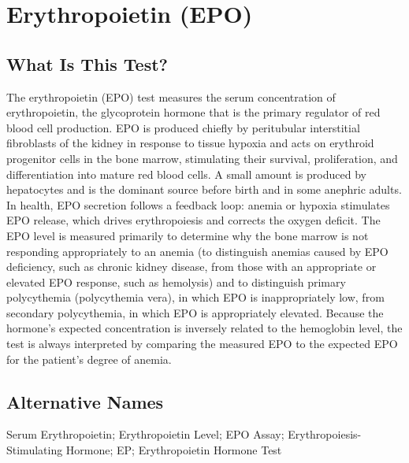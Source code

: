 \chapter{Erythropoietin (EPO)}

\section*{What Is This Test?}
The erythropoietin (EPO) test measures the serum concentration of erythropoietin, the glycoprotein hormone that is the primary regulator of red blood cell production. EPO is produced chiefly by peritubular interstitial fibroblasts of the kidney in response to tissue hypoxia and acts on erythroid progenitor cells in the bone marrow, stimulating their survival, proliferation, and differentiation into mature red blood cells. A small amount is produced by hepatocytes and is the dominant source before birth and in some anephric adults. In health, EPO secretion follows a feedback loop: anemia or hypoxia stimulates EPO release, which drives erythropoiesis and corrects the oxygen deficit. The EPO level is measured primarily to determine why the bone marrow is not responding appropriately to an anemia (to distinguish anemias caused by EPO deficiency, such as chronic kidney disease, from those with an appropriate or elevated EPO response, such as hemolysis) and to distinguish primary polycythemia (polycythemia vera), in which EPO is inappropriately low, from secondary polycythemia, in which EPO is appropriately elevated. Because the hormone's expected concentration is inversely related to the hemoglobin level, the test is always interpreted by comparing the measured EPO to the expected EPO for the patient's degree of anemia.

\section*{Alternative Names}
Serum Erythropoietin; Erythropoietin Level; EPO Assay; Erythropoiesis-Stimulating Hormone; EP; Erythropoietin Hormone Test

